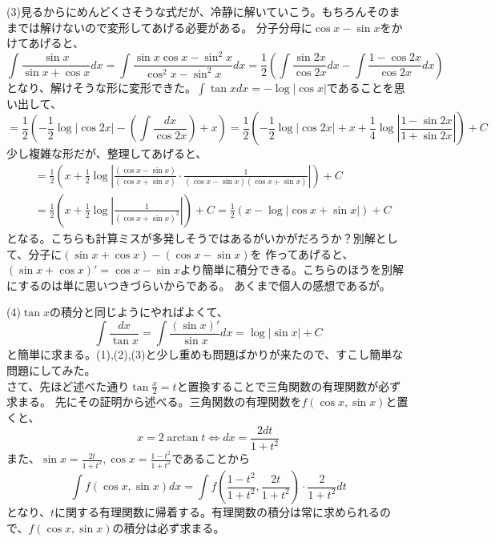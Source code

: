 \documentclass[a4j,dvipdfmx]{jsarticle}
\begin{document}
(3)見るからにめんどくさそうな式だが、冷静に解いていこう。もちろんそのままでは解けないので変形してあげる必要がある。
分子分母に$\cos x-\sin x$をかけてあげると、
\begin{equation*}
    \int\frac{\sin x}{\sin x+\cos x}dx=\int \frac{\sin x\cos x-\sin^2 x}{\cos^2 x-\sin^2 x}dx=\frac{1}{2}\left(\int\frac{\sin 2x}{\cos 2x}dx-\int \frac{1-\cos 2x}{\cos 2x}dx\right) 
\end{equation*}
となり、解けそうな形に変形できた。$\int \tan x dx=-\log|\cos x|$であることを思い出して、
\begin{equation*}
    =\frac{1}{2}\left(-\frac{1}{2}\log|\cos 2x|-(\int \frac{dx}{\cos 2x})+x\right)=\frac{1}{2}\left(-\frac{1}{2}\log|\cos 2x|+x+\frac{1}{4}\log\left|\frac{1-\sin 2x}{1+\sin 2x}\right|\right)+C
\end{equation*}
少し複雑な形だが、整理してあげると、
\begin{align*}
    &=\frac{1}{2}\left(x+\frac{1}{2}\log\left|\frac{(\cos x-\sin x)}{(\cos x+\sin x)}\cdot\frac{1}{(\cos x-\sin x)(\cos x+\sin x)}\right|\right)+C\\
    &=\frac{1}{2}\left(x+\frac{1}{2}\log\left|\frac{1}{(\cos x+\sin x)^2}\right|\right)+C=\frac{1}{2}\left(x-\log\left|\cos x+\sin x\right|\right)+C
\end{align*}
となる。こちらも計算ミスが多発しそうではあるがいかがだろうか？別解として、分子に$(\sin x+\cos x)-(\cos x-\sin x)$を
作ってあげると、$(\sin x+\cos x)'=\cos x-\sin x$より簡単に積分できる。こちらのほうを別解にするのは単に思いつきづらいからである。
あくまで個人の感想であるが。

(4)$\tan x$の積分と同じようにやればよくて、
\begin{equation*}
    \int\frac{dx}{\tan x}=\int\frac{(\sin x)'}{\sin x}dx=\log|\sin x|+C
\end{equation*}
と簡単に求まる。(1),(2),(3)と少し重めも問題ばかりが来たので、すこし簡単な問題にしてみた。\\

さて、先ほど述べた通り$\tan \frac{x}{2}=t$と置換することで三角関数の有理関数が必ず求まる。
先にその証明から述べる。三角関数の有理関数を$f(\cos x,\sin x)$と置くと、
\begin{equation*}
    x=2\arctan t\Longleftrightarrow dx=\frac{2dt}{1+t^2} 
\end{equation*}
また、$\displaystyle\sin x=\frac{2t}{1+t^2},\cos x=\frac{1-t^2}{1+t^2}$であることから
\begin{equation*}
    \int f(\cos x,\sin x)dx=\int f(\frac{1-t^2}{1+t^2},\frac{2t}{1+t^2})\cdot\frac{2}{1+t^2}dt
\end{equation*}
となり、$t$に関する有理関数に帰着する。有理関数の積分は常に求められるので、$f(\cos x,\sin x)$の積分は必ず求まる。
\end{document}
